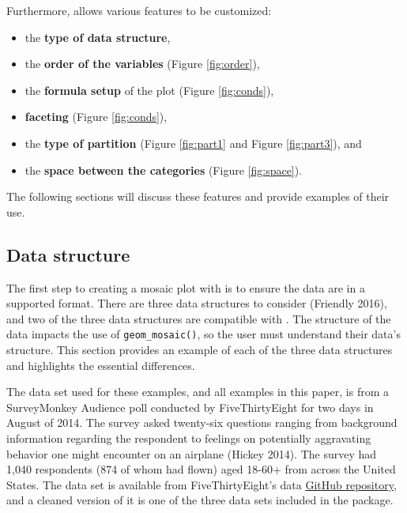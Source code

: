Furthermore,  allows various features to be customized:

\begin{itemize}
\item
  the \textbf{type of data structure},
\item
  the \textbf{order of the variables} (Figure \ref{fig:order}),
\item
  the \textbf{formula setup} of the plot (Figure \ref{fig:conds}),
\item
  \textbf{faceting} (Figure \ref{fig:conds}),
\item
  the \textbf{type of partition} (Figure \ref{fig:part1} and Figure \ref{fig:part3}), and
\item
  the \textbf{space between the categories} (Figure \ref{fig:space}).
\end{itemize}

The following sections will discuss these features and provide examples of their use.

\hypertarget{data-structure}{%
\subsection*{Data structure}\label{data-structure}}

The first step to creating a mosaic plot with  is to ensure the data are in a supported format. There are three data structures to consider (Friendly 2016), and two of the three data structures are compatible with . The structure of the data impacts the use of \texttt{geom\_mosaic()}, so the user must understand their data's structure. This section provides an example of each of the three data structures and highlights the essential differences.

The data set used for these examples, and all examples in this paper, is from a SurveyMonkey Audience poll conducted by FiveThirtyEight for two days in August of 2014. The survey asked twenty-six questions ranging from background information regarding the respondent to feelings on potentially aggravating behavior one might encounter on an airplane (Hickey 2014). The survey had 1,040 respondents (874 of whom had flown) aged 18-60+ from across the United States. The data set is available from FiveThirtyEight's data \href{https://github.com/fivethirtyeight/data/tree/master/flying-etiquette-survey}{GitHub repository}, and a cleaned version of it is one of the three data sets included in the  package.

